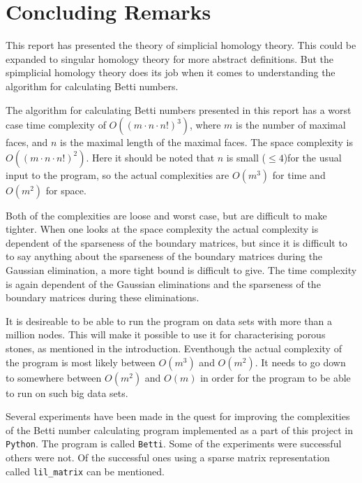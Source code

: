 \documentclass[11pt,a4paper,twoside, openright]{report}
\begin{document}
\chapter{Concluding Remarks}
This report has presented the theory of simplicial homology theory. This could be expanded to singular homology theory for more abstract definitions. But the spimplicial homology theory does its job when it comes to understanding the algorithm for calculating Betti numbers.

The algorithm for calculating Betti numbers presented in this report has a worst case time complexity of $O((m\cdot n\cdot n!)^3)$, where $m$ is the number of maximal faces, and $n$ is the maximal length of the maximal faces. The space complexity is $O((m\cdot n\cdot n!)^2)$. Here it should be noted that $n$ is small ($\leq 4$)for the usual input to the program, so the actual complexities are $O(m^3)$ for time and $O(m^2)$ for space. 

Both of the complexities are loose and worst case, but are difficult to make tighter. When one looks at the space complexity the actual complexity is dependent of the sparseness of the boundary matrices, but since it is difficult to to say anything about the sparseness of the boundary matrices during the Gaussian elimination, a more tight bound is difficult to give. The time complexity is again dependent of the Gaussian eliminations and the sparseness of the boundary matrices during these eliminations. 

It is desireable to be able to run the program on data sets with more than a million nodes. This will make it possible to use it for characterising porous stones, as mentioned in the introduction. Eventhough the actual complexity of the program is most likely between $O(m^3)$ and $O(m^2)$. It needs to go down to somewhere between $O(m^2)$ and $O(m)$ in order for the program to be able to run on such big data sets.

Several experiments have been made in the quest for improving the complexities of the Betti number calculating program implemented as a part of this project in \texttt{Python}. The program is called \texttt{Betti}. Some of the experiments were successful others were not. Of the successful ones using a sparse matrix representation called \texttt{lil\_matrix} can be mentioned. 
\end{document}
